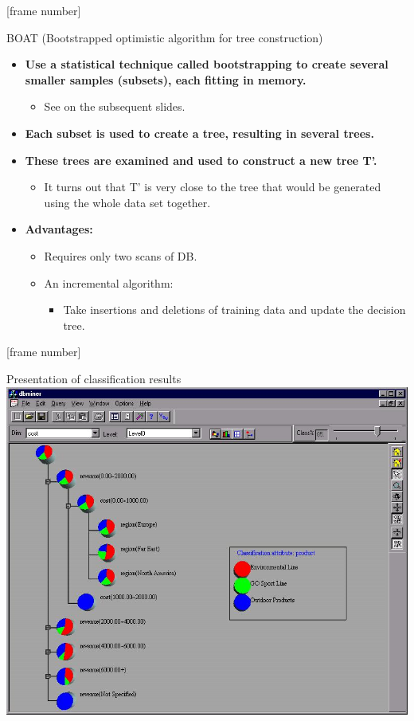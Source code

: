 \documentclass[aspectratio=169,t,table]{beamer}
\begin{document}
  {
    [frame number]
    \begin{frame}{BOAT (Bootstrapped optimistic algorithm for tree construction)}
      \begin{itemize}
        \item \textbf{Use a statistical technique called bootstrapping to create several smaller samples (subsets), each fitting in memory.}
        \begin{itemize}
          \item See on the subsequent slides.
        \end{itemize}
        \item \textbf{Each subset is used to create a tree, resulting in several trees.}
        \item \textbf{These trees are examined and used to construct a new tree T'.}
        \begin{itemize}
          \item It turns out that T' is very close to the tree that would be generated \\
          using the whole data set together.
        \end{itemize}
        \item \textbf{Advantages:}
        \begin{itemize}
          \item Requires only two scans of DB.
          \item An incremental algorithm:
          \begin{itemize}
            \item Take insertions and deletions of training data and update the decision tree.
          \end{itemize}
        \end{itemize}
      \end{itemize}
    \end{frame}
  }

  {
    [frame number]
    \begin{frame}{Presentation of classification results}
      \centering
      \includegraphics[height=0.9\textheight]{img/classification1.jpeg}
    \end{frame}
  }
\end{document}
